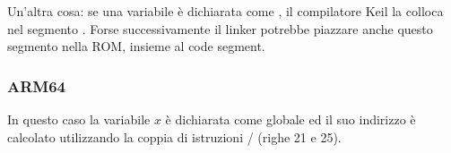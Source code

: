 \myindex{\ROM}

Un'altra cosa: se una variabile è dichiarata come , il compilatore Keil la colloca nel segmento .
Forse successivamente il linker potrebbe piazzare anche questo segmento nella ROM, insieme al code segment.

\subsubsection{ARM64}




In questo caso la variabile $x$ è dichiarata come globale ed il suo indirizzo è calcolato utilizzando la coppia di istruzioni 
/ (righe 21 e 25).

